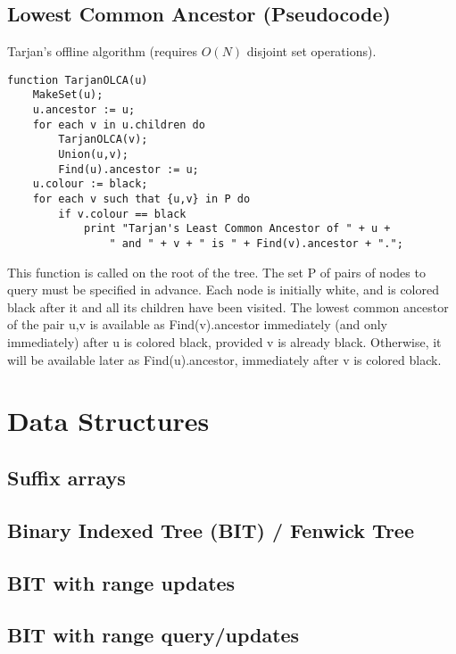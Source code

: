 \documentclass[9pt]{extarticle}
\begin{document}
\begin{multicols*}{3}
\subsection{Lowest Common Ancestor (Pseudocode)} %
Tarjan's offline algorithm (requires $O(N)$ disjoint set operations).
\begin{lstlisting}
function TarjanOLCA(u)
    MakeSet(u);
    u.ancestor := u;
    for each v in u.children do
        TarjanOLCA(v);
        Union(u,v);
        Find(u).ancestor := u;
    u.colour := black;
    for each v such that {u,v} in P do
        if v.colour == black
            print "Tarjan's Least Common Ancestor of " + u +
                " and " + v + " is " + Find(v).ancestor + ".";
\end{lstlisting}
This function is called on the root of the tree. The set P of pairs of nodes to
query must be specified in advance. Each node is initially white, and is
colored black after it and all its children have been visited. The lowest
common ancestor of the pair {u,v} is available as Find(v).ancestor immediately
(and only immediately) after u is colored black, provided v is already black.
Otherwise, it will be available later as Find(u).ancestor, immediately after v
is colored black.

\section{Data Structures}

\subsection{Suffix arrays} %


\subsection{Binary Indexed Tree (BIT) / Fenwick Tree} %


\subsection{BIT with range updates} %



\subsection{BIT with range query/updates}



\end{multicols*}
\end{document}
